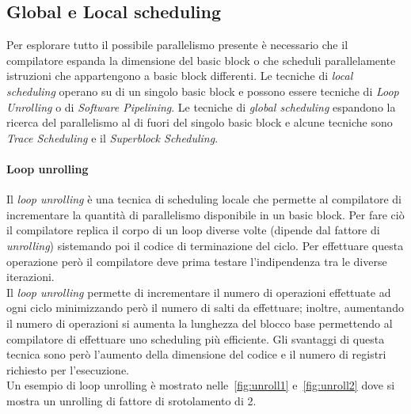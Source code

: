 \subsection{Global e Local scheduling}
Per esplorare tutto il possibile parallelismo presente è necessario che il compilatore espanda la dimensione del basic block o che scheduli parallelamente istruzioni che appartengono a basic block differenti.
Le tecniche di \emph{local scheduling}  operano su di un singolo basic block e possono essere tecniche di \emph{Loop Unrolling} o di \emph{Software Pipelining}.
Le tecniche di \emph{global scheduling} espandono la ricerca del parallelismo al di fuori del singolo basic block e alcune tecniche sono \emph{Trace Scheduling} e il \emph{Superblock Scheduling}.\\
\paragraph{Loop unrolling}
Il \emph{loop unrolling} è una tecnica di scheduling locale che permette al compilatore di incrementare la quantità di parallelismo disponibile in un basic block. Per fare ciò il compilatore replica il corpo di un loop diverse volte (dipende dal fattore di \emph{unrolling}) sistemando poi il codice di terminazione del ciclo. Per effettuare questa operazione però il compilatore deve prima testare l'indipendenza tra le diverse iterazioni.\\
Il \emph{loop unrolling} permette di incrementare il numero di operazioni effettuate ad ogni ciclo minimizzando però il numero di salti da effettuare; inoltre, aumentando il numero di operazioni si aumenta la lunghezza del blocco base permettendo al compilatore di effettuare uno scheduling più efficiente. Gli svantaggi di questa tecnica sono però l'aumento della dimensione del codice e il numero di registri richiesto per l'esecuzione.\\
Un esempio di loop unrolling è mostrato nelle \figurname\,\ref{fig:unroll1} e \figurname\,\ref{fig:unroll2} dove si mostra un unrolling di fattore di srotolamento di 2.

